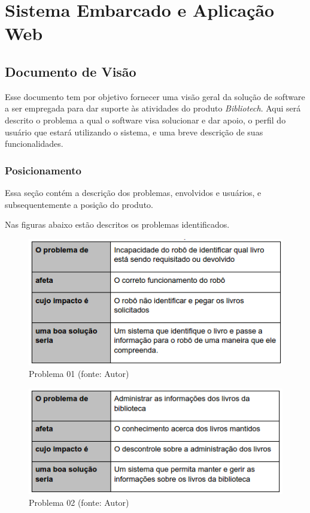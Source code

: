 \section[Sistema Embarcado e Aplicação Web]{Sistema Embarcado e Aplicação Web}

\subsection{Documento de Visão}

Esse documento tem por objetivo fornecer uma visão geral da solução de software a ser empregada para dar suporte às atividades do produto \textit{Bibliotech}. Aqui será descrito o problema a qual o software visa solucionar e dar apoio, o perfil do usuário que estará utilizando o sistema, e uma breve descrição de suas funcionalidades.

\subsubsection{Posicionamento}
Essa seção contém a descrição dos problemas, envolvidos e usuários, e subsequentemente a posição do produto.


Nas figuras abaixo estão descritos os problemas identificados.

\begin{figure}[!h]
\centering
\includegraphics[scale=0.65, angle = 360]{figuras/descricao_problema1}
\caption[]{Problema 01 (fonte: Autor)}
\end{figure}
\FloatBarrier

\begin{figure}[!h]
\centering
\includegraphics[scale=0.65, angle = 360]{figuras/descricao_problema2}
\caption[]{Problema 02 (fonte: Autor)}
\end{figure}
\FloatBarrier

